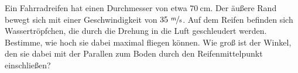 \begin{Exercise}[label = bikewheel, title = Wassertropfen und Fahrrad, origin = Ein Klassiker, difficulty = 3]
	Ein Fahrradreifen hat einen Durchmesser von etwa $70~\mathrm{cm}$. Der äußere Rand bewegt sich mit einer Geschwindigkeit von $35~\mathrm{\nicefrac{m}{s}}$. Auf dem Reifen befinden sich Wassertröpfchen, die durch die Drehung in die Luft geschleudert werden. Bestimme, wie hoch sie dabei maximal fliegen können. Wie groß ist der Winkel, den sie dabei mit der Parallen zum Boden durch den Reifenmittelpunkt einschließen?
\end{Exercise}

	
